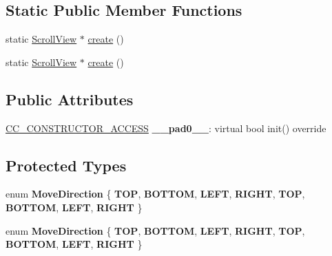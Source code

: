 \subsection*{Static Public Member Functions}
\begin{DoxyCompactItemize}
\item 
static \hyperlink{classui_1_1ScrollView}{Scroll\+View} $\ast$ \hyperlink{classui_1_1ScrollView_a67c16969c9f515d00488fb58dd8318a3}{create} ()
\item 
static \hyperlink{classui_1_1ScrollView}{Scroll\+View} $\ast$ \hyperlink{classui_1_1ScrollView_aa8b6477b537926b7da62c999562b1d5c}{create} ()
\end{DoxyCompactItemize}
\subsection*{Public Attributes}
\begin{DoxyCompactItemize}
\item 
\mbox{\label{classui_1_1ScrollView_a068b19a17b09ebc6ce66a87f38f2ba1a}} 
\hyperlink{_2cocos2d_2cocos_2base_2ccConfig_8h_a25ef1314f97c35a2ed3d029b0ead6da0}{C\+C\+\_\+\+C\+O\+N\+S\+T\+R\+U\+C\+T\+O\+R\+\_\+\+A\+C\+C\+E\+SS} {\bfseries \+\_\+\+\_\+pad0\+\_\+\+\_\+}\+: virtual bool init() override
\end{DoxyCompactItemize}
\subsection*{Protected Types}
\begin{DoxyCompactItemize}
\item 
\mbox{\label{classui_1_1ScrollView_a7cce984112f16730827722b344fb0153}} 
enum {\bfseries Move\+Direction} \{ \newline
{\bfseries T\+OP}, 
{\bfseries B\+O\+T\+T\+OM}, 
{\bfseries L\+E\+FT}, 
{\bfseries R\+I\+G\+HT}, 
\newline
{\bfseries T\+OP}, 
{\bfseries B\+O\+T\+T\+OM}, 
{\bfseries L\+E\+FT}, 
{\bfseries R\+I\+G\+HT}
 \}
\item 
\mbox{\label{classui_1_1ScrollView_a7cce984112f16730827722b344fb0153}} 
enum {\bfseries Move\+Direction} \{ \newline
{\bfseries T\+OP}, 
{\bfseries B\+O\+T\+T\+OM}, 
{\bfseries L\+E\+FT}, 
{\bfseries R\+I\+G\+HT}, 
\newline
{\bfseries T\+OP}, 
{\bfseries B\+O\+T\+T\+OM}, 
{\bfseries L\+E\+FT}, 
{\bfseries R\+I\+G\+HT}
 \}
\end{DoxyCompactItemize}
